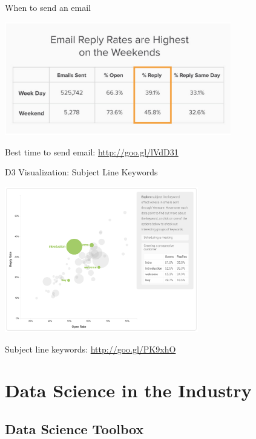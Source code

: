 \documentclass[10pt]{beamer}
\begin{document}
\begin{frame}{When to send an email}
\begin{overprint}
\begin{center}
              \includegraphics[height=140pt]{../graphs/email_analysis_sent_weekday}
            \end{center}
          \end{overprint}
      \centerline{\footnotesize Best time to send email: \url{http://goo.gl/lVdD31}}
    \end{frame}

    \begin{frame}{D3 Visualization: Subject Line Keywords}
      \begin{center}
        \includegraphics[height=180pt]{../graphs/email_analysis_subject_line}
      \end{center}    
      \centerline{\footnotesize Subject line keywords: \url{http://goo.gl/PK9xhO}}
    \end{frame}

\section{Data Science in the Industry}

  \subsection{Data Science Toolbox}
  
\end{document}
